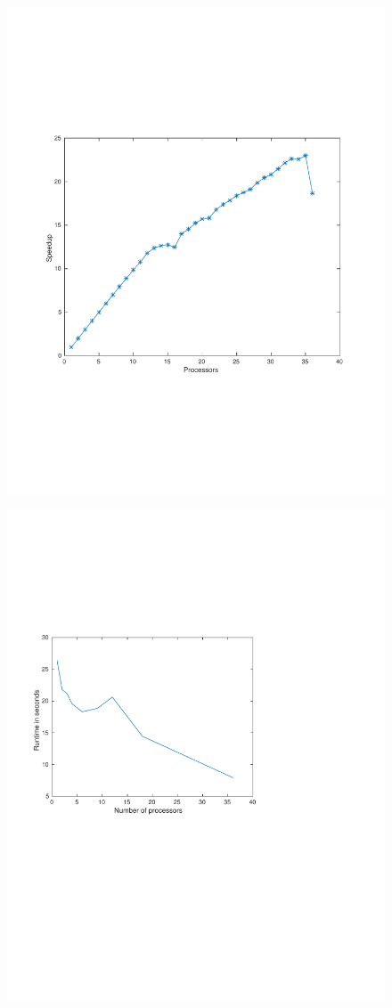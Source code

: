 
\begin{figure}
\centering
\includegraphics[width=0.7\linewidth]{./figures/speedup}
\caption{}
\label{fig:speedup}
\end{figure}




\begin{figure}
\centering
\includegraphics[width=0.7\linewidth]{./figures/runtime}
\caption{}
\label{fig:runtime}
\end{figure}

